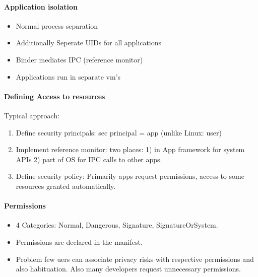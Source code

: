 \paragraph{Application isolation}
\begin{itemize}
    \item Normal process separation
    \item Additionally Seperate UIDs for all applications
    \item Binder mediates IPC (reference monitor)
    \item Applications run in separate vm's
\end{itemize}{}

\paragraph{Defining Access to resources}
Typical approach:
\begin{enumerate}
    \item Define security principals: sec principal = app (unlike Linux: user)
    \item Implement reference monitor: two places: 1) in App framework for system APIs 2) part of OS for IPC calls to other apps.
    \item Define security policy: Primarily apps request permissions, access to some resources granted automatically.
\end{enumerate}{}

\paragraph{Permissions}
\begin{itemize}
    \item 4 Categories: Normal, Dangerous, Signature, SignatureOrSystem.
    \item Permissions are declared in the manifest.
    \item Problem few uers can associate privacy risks with respective permissions and also habituation. Also many developers request unnecessary permissions.
\end{itemize}{}

